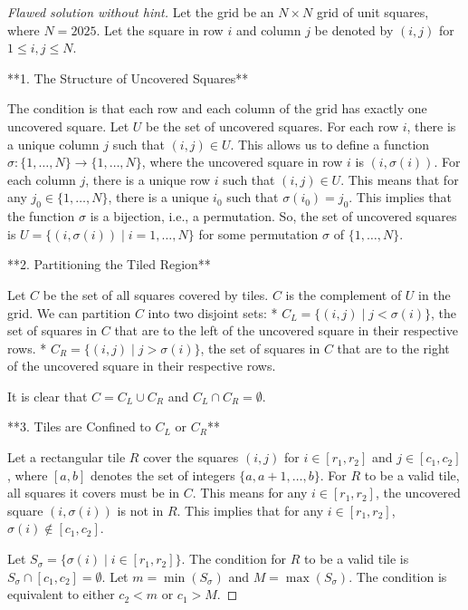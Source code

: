 \begin{proof} [Flawed solution without hint]
Let the grid be an $N \times N$ grid of unit squares, where $N=2025$. Let the square in row $i$ and column $j$ be denoted by $(i,j)$ for $1 \le i,j \le N$.

**1. The Structure of Uncovered Squares**

The condition is that each row and each column of the grid has exactly one uncovered square. Let $U$ be the set of uncovered squares.
For each row $i$, there is a unique column $j$ such that $(i,j) \in U$. This allows us to define a function $\sigma: \{1, \dots, N\} \to \{1, \dots, N\}$, where the uncovered square in row $i$ is $(i, \sigma(i))$.
For each column $j$, there is a unique row $i$ such that $(i,j) \in U$. This means that for any $j_0 \in \{1, \dots, N\}$, there is a unique $i_0$ such that $\sigma(i_0) = j_0$. This implies that the function $\sigma$ is a bijection, i.e., a permutation.
So, the set of uncovered squares is $U = \{(i, \sigma(i)) \mid i=1, \dots, N\}$ for some permutation $\sigma$ of $\{1, \dots, N\}$.

**2. Partitioning the Tiled Region**

Let $C$ be the set of all squares covered by tiles. $C$ is the complement of $U$ in the grid. We can partition $C$ into two disjoint sets:
*   $C_L = \{(i,j) \mid j < \sigma(i)\}$, the set of squares in $C$ that are to the left of the uncovered square in their respective rows.
*   $C_R = \{(i,j) \mid j > \sigma(i)\}$, the set of squares in $C$ that are to the right of the uncovered square in their respective rows.

It is clear that $C = C_L \cup C_R$ and $C_L \cap C_R = \emptyset$.

**3. Tiles are Confined to $C_L$ or $C_R$**

Let a rectangular tile $R$ cover the squares $(i,j)$ for $i \in [r_1, r_2]$ and $j \in [c_1, c_2]$, where $[a,b]$ denotes the set of integers $\{a, a+1, \dots, b\}$. For $R$ to be a valid tile, all squares it covers must be in $C$. This means for any $i \in [r_1, r_2]$, the uncovered square $(i, \sigma(i))$ is not in $R$. This implies that for any $i \in [r_1, r_2]$, $\sigma(i) \notin [c_1, c_2]$.

Let $S_{\sigma} = \{\sigma(i) \mid i \in [r_1, r_2]\}$. The condition for $R$ to be a valid tile is $S_{\sigma} \cap [c_1, c_2] = \emptyset$.
Let $m = \min(S_{\sigma})$ and $M = \max(S_{\sigma})$. The condition is equivalent to either $c_2 < m$ or $c_1 > M$.


\end{proof}
